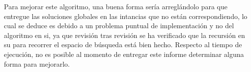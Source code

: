 Para mejorar este algoritmo, una buena forma ser\'ia arregl\'andolo para que entregue las soluciones globales en las intancias que no est\'an correspondiendo, lo cual se deduce es debido a un problema puntual de implementaci\'on y no del algoritmo en si, ya que revisi\'on tras revisi\'on se ha verificado que la recursi\'on en su para recorrer el espacio de b\'usqueda est\'a bien hecho. Respecto al tiempo de ejecuci\'on, no es posible al momento de entregar este informe determinar alguna forma para mejorarlo.